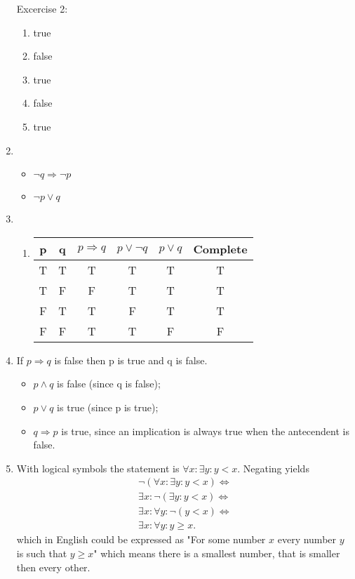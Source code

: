 \documentclass{article}
\begin{document}
\begin{enumerate}
        Excercise 2:
        \begin{enumerate}
            \item true
            \item false
            \item true
            \item false
            \item true
        \end{enumerate}

    \item
        \begin{itemize}
            \item $\lnot q \Rightarrow \lnot p$
            \item $\lnot p \lor q$
        \end{itemize}

    \item
        \begin{enumerate}
            \item
                \begin{tabular}{c | c | c | c | c | c}
                    p & q & $ p \Rightarrow q $ & $p \lor \lnot q $ & $ p \lor q $ & Complete \\ \hline
                    T & T & T & T & T & T \\
                    T & F & F & T & T & T \\
                    F & T & T & F & T & T \\
                    F & F & T & T & F & F
                \end{tabular}
        \end{enumerate}
    \item If $p \Rightarrow q $ is false then p is true and q is false.
        \begin{itemize}
            \item $p \land q$ is false (since q is false);
            \item $p \lor q$ is true (since p is true);
            \item $q \Rightarrow p$ is true, since an implication is always true when the antecendent is false.
        \end{itemize}
    \item With logical symbols the statement is $\forall x : \exists y : y < x$. Negating yields
        \begin{align*}
            \lnot(\forall x : \exists y : y < x) \Leftrightarrow \\
            \exists x : \lnot(\exists y : y < x) \Leftrightarrow \\
            \exists x : \forall y : \lnot (y < x) \Leftrightarrow \\
            \exists x : \forall y : y \geq x.
        \end{align*}
        which in English could be expressed as "For some number $x$ every number $y$ is such that $y \geq x$" which means there is a smallest number, that is smaller then every other.


\end{enumerate}
\end{document}
